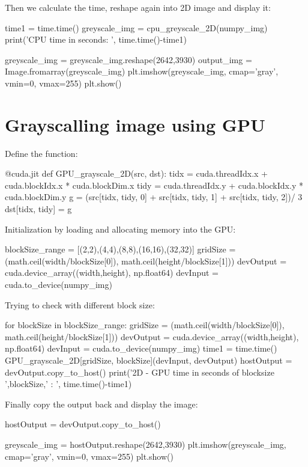 \documentclass{article}
\begin{document}
Then we calculate the time, reshape again into 2D image and display it:
\begin{python}
time1 = time.time()
greyscale_img = cpu_greyscale_2D(numpy_img)
print('CPU time in seconds: ', time.time()-time1)


greyscale_img = greyscale_img.reshape(2642,3930)
output_img = Image.fromarray(greyscale_img)
plt.imshow(greyscale_img, cmap='gray', vmin=0, vmax=255)
plt.show()
\end{python}

\section{Grayscalling image using GPU}
Define the function:
\begin{python}
@cuda.jit
def GPU_grayscale_2D(src, dst):
  tidx = cuda.threadIdx.x + cuda.blockIdx.x * cuda.blockDim.x
  tidy = cuda.threadIdx.y + cuda.blockIdx.y * cuda.blockDim.y 
  g = (src[tidx, tidy, 0] + src[tidx, tidy, 1] + src[tidx, tidy, 2])/ 3
  dst[tidx, tidy] = g
\end{python}

Initialization by loading and allocating memory into the GPU:
\begin{python}
blockSize_range = [(2,2),(4,4),(8,8),(16,16),(32,32)]
gridSize = (math.ceil(width/blockSize[0]), math.ceil(height/blockSize[1]))
devOutput = cuda.device_array((width,height), np.float64)
devInput = cuda.to_device(numpy_img)
\end{python}

Trying to check with different block size:

\begin{python}
for blockSize in blockSize_range:
  gridSize = (math.ceil(width/blockSize[0]), math.ceil(height/blockSize[1]))
  devOutput = cuda.device_array((width,height), np.float64)
  devInput = cuda.to_device(numpy_img)
  time1 = time.time()
  GPU_grayscale_2D[gridSize, blockSize](devInput, devOutput)
  hostOutput = devOutput.copy_to_host()
  print('2D - GPU time in seconds of blocksize ',blockSize,' : ', time.time()-time1)
\end{python}

Finally copy the output back and display the image:
\begin{python}
hostOutput = devOutput.copy_to_host()

greyscale_img = hostOutput.reshape(2642,3930)
plt.imshow(greyscale_img, cmap='gray', vmin=0, vmax=255)
plt.show()
\end{python}
\end{document}
